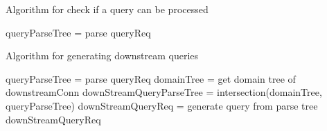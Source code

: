 \begin{algorithm}
\caption{Algorithm for check if a query can be processed}
\label{algo:can_process_query}
\begin{algorithmic}
\State queryParseTree = parse queryReq
\State {}
\EndFunction
\end{algorithmic}
\end{algorithm}

\begin{algorithm}
\caption{Algorithm for generating downstream queries}
\label{algo:generate_downsrream}
\begin{algorithmic}
\State queryParseTree = parse queryReq
\State domainTree = get domain tree of downstreamConn
\State downStreamQueryParseTree = intersection(domainTree, queryParseTree)
\State downStreamQueryReq = generate query from parse tree
\State \Return downStreamQueryReq
\EndFunction
\end{algorithmic}
\end{algorithm}







